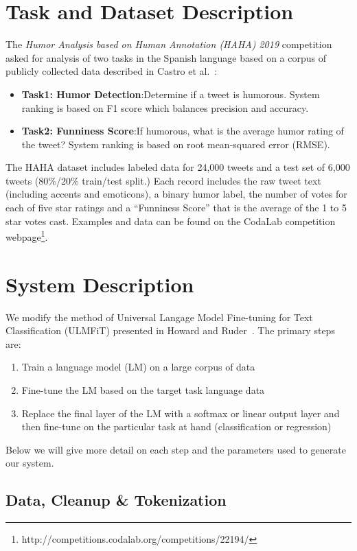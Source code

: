 \documentclass[runningheads]{llncs}
\begin{document}
\section{Task and Dataset Description}
\label{sec:task}
The \textit{Humor Analysis based on Human Annotation (HAHA) 2019}\cite{overview_haha2019} competition asked for analysis of two tasks in the Spanish language based on a corpus of publicly collected data described in Castro et al.~\cite{castro2018crowd}:
\begin{itemize}
\item \textbf{Task1: Humor Detection}:Determine if a tweet is humorous. System ranking is based on F1 score which balances precision and accuracy.
\item \textbf{Task2: Funniness Score}:If humorous, what is the average humor rating of the tweet? System ranking is based on root mean-squared error (RMSE).
\end{itemize}
The HAHA dataset includes labeled data for 24,000 tweets and a test set of 6,000 tweets (80\%/20\% train/test split.)  Each record includes the raw tweet text (including accents and emoticons), a binary humor label, the number of votes for each of five star ratings and a ``Funniness Score'' that is the average of the 1 to 5 star votes cast.  Examples and data can be found on the CodaLab competition webpage\footnote{http://competitions.codalab.org/competitions/22194/}.

\section{System Description}
\label{sec:system}
We modify the method of Universal Langage Model Fine-tuning for Text Classification (ULMFiT) presented in Howard and Ruder~\cite{HowardRuder:DBLP:journals/corr/abs-1801-06146}.  The primary steps are: 
\begin{enumerate}
	\item Train a language model (LM) on a large corpus of data
	\item Fine-tune the LM based on the target task language data
	\item Replace the final layer of the LM with a softmax or linear output layer and then fine-tune on the particular task at hand (classification or regression)
\end{enumerate}
Below we will give more detail on each step and the parameters used to generate our system.
\subsection{Data, Cleanup \& Tokenization}
\label{sec:datacleaning}
\end{document}
